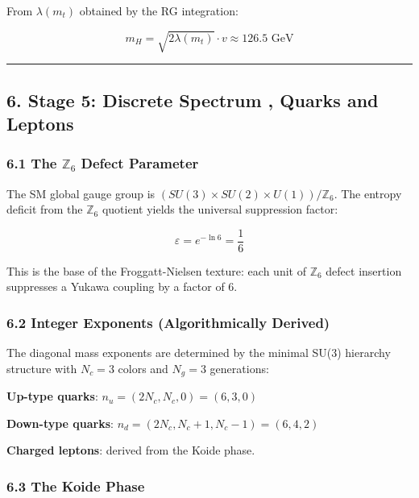 From \(\lambda(m_t)\) obtained by the RG integration:

\[m_H = \sqrt{2\lambda(m_t)} \cdot v \approx 126.5 \text{ GeV}\]

\begin{center}\rule{0.5\linewidth}{0.5pt}\end{center}

\subsection{6. Stage 5: Discrete Spectrum , Quarks and Leptons}\label{6-stage-5-discrete-spectrum--quarks-and-leptons}

\subsubsection{\texorpdfstring{6.1 The \(\mathbb{Z}_6\) Defect Parameter}{6.1 The \textbackslash mathbb\{Z\}\_6 Defect Parameter}}\label{61-the-mathbbz_6-defect-parameter}

The SM global gauge group is \((SU(3) \times SU(2) \times U(1))/\mathbb{Z}_6\). The entropy deficit from the \(\mathbb{Z}_6\) quotient yields the universal suppression factor:

\[\varepsilon = e^{-\ln 6} = \frac{1}{6}\]

This is the base of the Froggatt-Nielsen texture: each unit of \(\mathbb{Z}_6\) defect insertion suppresses a Yukawa coupling by a factor of 6.

\subsubsection{6.2 Integer Exponents (Algorithmically Derived)}\label{62-integer-exponents-algorithmically-derived}

The diagonal mass exponents are determined by the minimal SU(3) hierarchy structure with \(N_c = 3\) colors and \(N_g = 3\) generations:

\textbf{Up-type quarks}: \(n_u = (2N_c, N_c, 0) = (6, 3, 0)\)

\textbf{Down-type quarks}: \(n_d = (2N_c, N_c+1, N_c-1) = (6, 4, 2)\)

\textbf{Charged leptons}: derived from the Koide phase.

\subsubsection{6.3 The Koide Phase}\label{63-the-koide-phase}


